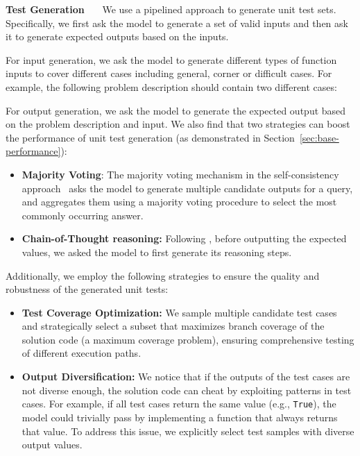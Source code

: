 \textbf{Test Generation}\ \ \ 
\label{sec:test-generation}
We use a pipelined approach to generate unit test sets. Specifically, we first ask the model to generate a set of valid inputs and then ask it to generate expected outputs based on the inputs.

For input generation, we ask the model to generate different types of function inputs to cover different cases including general, corner or difficult cases. For example, the following problem description should contain two different cases:


For output generation, we ask the model to generate the expected output based on the problem description and input. We also find that two strategies can boost the performance of unit test generation (as demonstrated in Section~\ref{sec:base-performance}):
\begin{itemize}[nosep, leftmargin=*]
    \item \textbf{Majority Voting}: The majority voting mechanism in the self-consistency approach~\cite{wang2022self} asks the model to generate multiple candidate outputs for a query, and aggregates them using a majority voting procedure to select the most commonly occurring answer.
    \item \textbf{Chain-of-Thought reasoning:} Following \citet{wei2022chain}, before outputting the expected values, we asked the model to first generate its reasoning steps.
\end{itemize}

Additionally, we employ the following strategies to ensure the quality and robustness of the generated unit tests:

\begin{itemize}[nosep, leftmargin=*]
    \item \textbf{Test Coverage Optimization:} We sample multiple candidate test cases and strategically select a subset that maximizes branch coverage of the solution code (a maximum coverage problem), ensuring comprehensive testing of different execution paths.
    \item \textbf{Output Diversification:} We notice that if the outputs of the test cases are not diverse enough, the solution code can cheat by exploiting patterns in test cases. For example, if all test cases return the same value (e.g., {\tt True}), the model could trivially pass by implementing a function that always returns that value. To address this issue, we explicitly select test samples with diverse output values.
\end{itemize}


